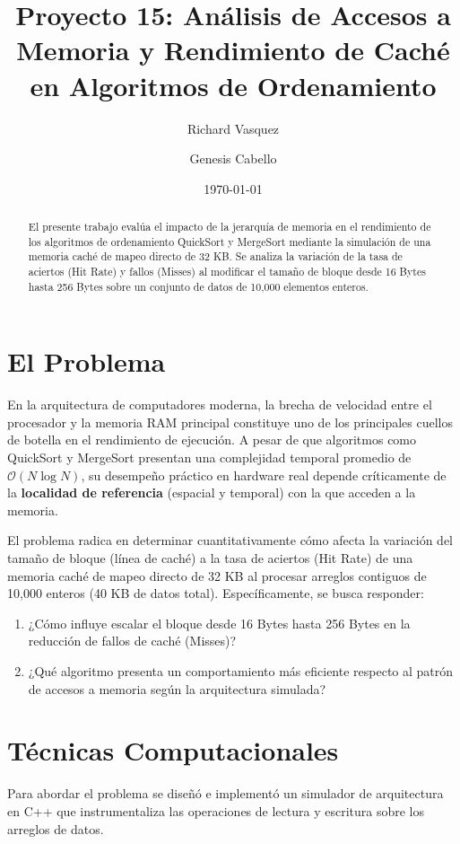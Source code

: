 \documentclass[12pt, a4paper]{article}
\title{Proyecto 15: Análisis de Accesos a Memoria y Rendimiento de Caché en Algoritmos de Ordenamiento}
\author{Richard Vasquez \and Genesis Cabello}
\date{\today}
\begin{document}
\maketitle

\begin{abstract}
El presente trabajo evalúa el impacto de la jerarquía de memoria en el rendimiento de los algoritmos de ordenamiento QuickSort y MergeSort mediante la simulación de una memoria caché de mapeo directo de 32 KB. Se analiza la variación de la tasa de aciertos (Hit Rate) y fallos (Misses) al modificar el tamaño de bloque desde 16 Bytes hasta 256 Bytes sobre un conjunto de datos de 10,000 elementos enteros. 
\end{abstract}

\section{El Problema}
En la arquitectura de computadores moderna, la brecha de velocidad entre el procesador y la memoria RAM principal constituye uno de los principales cuellos de botella en el rendimiento de ejecución. A pesar de que algoritmos como QuickSort y MergeSort presentan una complejidad temporal promedio de $\mathcal{O}(N \log N)$, su desempeño práctico en hardware real depende críticamente de la \textbf{localidad de referencia} (espacial y temporal) con la que acceden a la memoria. 

El problema radica en determinar cuantitativamente cómo afecta la variación del tamaño de bloque (línea de caché) a la tasa de aciertos (Hit Rate) de una memoria caché de mapeo directo de 32 KB al procesar arreglos contiguos de 10,000 enteros (40 KB de datos total). Específicamente, se busca responder:
\begin{enumerate}
\item ¿Cómo influye escalar el bloque desde 16 Bytes hasta 256 Bytes en la reducción de fallos de caché (Misses)?
\item ¿Qué algoritmo presenta un comportamiento más eficiente respecto al patrón de accesos a memoria según la arquitectura simulada?
\end{enumerate}

\section{Técnicas Computacionales}
Para abordar el problema se diseñó e implementó un simulador de arquitectura en C++ que instrumentaliza las operaciones de lectura y escritura sobre los arreglos de datos.
\end{document}
